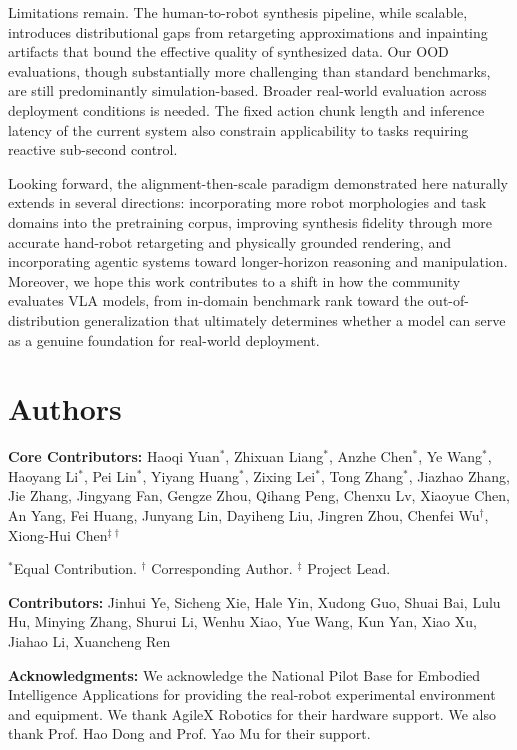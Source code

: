 \documentclass{article} %
\begin{document}
Limitations remain. The human-to-robot synthesis pipeline, while scalable, introduces distributional gaps from retargeting approximations and inpainting artifacts that bound the effective quality of synthesized data. Our OOD evaluations, though substantially more challenging than standard benchmarks, are still predominantly simulation-based. Broader real-world evaluation across deployment conditions is needed. The fixed action chunk length and inference latency of the current system also constrain applicability to tasks requiring reactive sub-second control.

Looking forward, the alignment-then-scale paradigm demonstrated here naturally extends in several directions: incorporating more robot morphologies and task domains into the pretraining corpus, improving synthesis fidelity through more accurate hand-robot retargeting and physically grounded rendering, and incorporating agentic systems toward longer-horizon reasoning and manipulation. Moreover, we hope this work contributes to a shift in how the community evaluates VLA models, from in-domain benchmark rank toward the out-of-distribution generalization that ultimately determines whether a model can serve as a genuine foundation for real-world deployment.


\section{Authors}

\textbf{Core Contributors:} Haoqi Yuan$^*$, Zhixuan Liang$^*$, Anzhe Chen$^*$, Ye Wang$^*$, Haoyang Li$^*$, Pei Lin$^*$, Yiyang Huang$^*$, Zixing Lei$^*$, Tong Zhang$^*$, Jiazhao Zhang, Jie Zhang, Jingyang Fan, Gengze Zhou, Qihang Peng, Chenxu Lv, Xiaoyue Chen, An Yang, Fei Huang, Junyang Lin, Dayiheng Liu, Jingren Zhou, Chenfei Wu$^\dagger$, Xiong-Hui Chen$^{\ddagger\dagger}$

$^*$Equal Contribution.
$^\dagger$ Corresponding Author.
$^\ddagger$ Project Lead.

\textbf{Contributors:} Jinhui Ye, Sicheng Xie, Hale Yin, 
Xudong Guo, Shuai Bai, Lulu Hu, Minying Zhang, Shurui Li, Wenhu Xiao, Yue Wang, Kun Yan, Xiao Xu, Jiahao Li, Xuancheng Ren

\textbf{Acknowledgments:} We acknowledge the National Pilot Base for Embodied Intelligence Applications for providing the real-robot experimental environment and equipment. We thank AgileX Robotics for their hardware support. We also thank Prof. Hao Dong and Prof. Yao Mu for their support.


\clearpage


\end{document}
